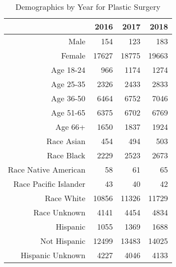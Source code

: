 \begin{table}[ht]
\centering
\begin{tabular}{rrrr}
  \hline
 & 2016 & 2017 & 2018 \\ 
  \hline
Male & 154 & 123 & 183 \\ 
  Female & 17627 & 18775 & 19663 \\ 
  Age 18-24 & 966 & 1174 & 1274 \\ 
  Age 25-35 & 2326 & 2433 & 2833 \\ 
  Age 36-50 & 6464 & 6752 & 7046 \\ 
  Age 51-65 & 6375 & 6702 & 6769 \\ 
  Age 66+ & 1650 & 1837 & 1924 \\ 
  Race Asian & 454 & 494 & 503 \\ 
  Race Black & 2229 & 2523 & 2673 \\ 
  Race Native American &  58 &  61 &  65 \\ 
  Race Pacific Islander &  43 &  40 &  42 \\ 
  Race White & 10856 & 11326 & 11729 \\ 
  Race Unknown & 4141 & 4454 & 4834 \\ 
  Hispanic & 1055 & 1369 & 1688 \\ 
  Not Hispanic & 12499 & 13483 & 14025 \\ 
  Hispanic Unknown & 4227 & 4046 & 4133 \\ 
   \hline
\end{tabular}
\caption{Demographics by Year for Plastic Surgery} 
\end{table}
